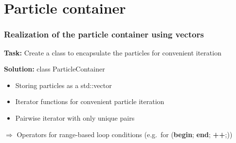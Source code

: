 \section{Particle container}

\begin{frame}
    \frametitle{Realization of the particle container using vectors}
    \textbf{Task:} Create a class to encapsulate the particles for convenient iteration

    \textbf{Solution:} class ParticleContainer

    \begin{itemize}
        \item Storing particles as a std::vector
        \item Iterator functions for convenient particle iteration
        \item Pairwise iterator with only unique pairs
    \end{itemize}
    $\Rightarrow$ Operators for range-based loop conditions (e.g.\ for (\textbf{begin}; \textbf{end}; \textbf{++};))
\end{frame}